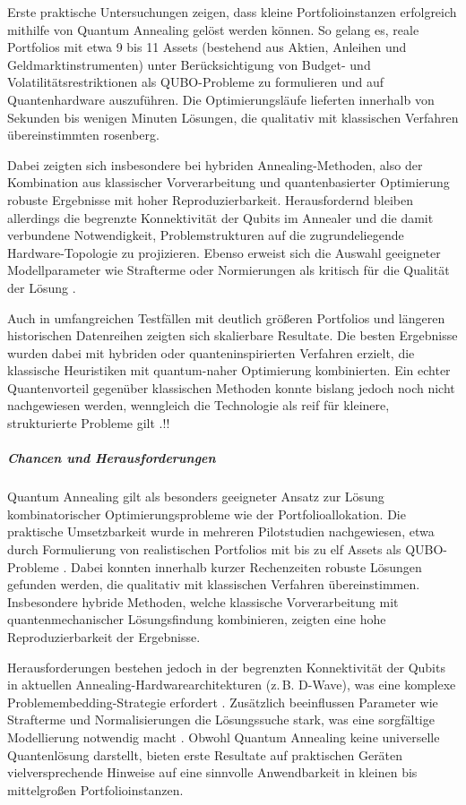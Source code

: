 Erste praktische Untersuchungen zeigen, dass kleine Portfolioinstanzen erfolgreich mithilfe von Quantum Annealing gelöst werden können. So gelang es, reale Portfolios mit etwa 9 bis 11 Assets (bestehend aus Aktien, Anleihen und Geldmarktinstrumenten) unter Berücksichtigung von Budget- und Volatilitätsrestriktionen als QUBO-Probleme zu formulieren und auf Quantenhardware auszuführen. Die Optimierungsläufe lieferten innerhalb von Sekunden bis wenigen Minuten Lösungen, die qualitativ mit klassischen Verfahren übereinstimmten \cite{sakuler_real-world_2025}rosenberg.
 
Dabei zeigten sich insbesondere bei hybriden Annealing-Methoden, also der Kombination aus klassischer Vorverarbeitung und quantenbasierter Optimierung robuste Ergebnisse mit hoher Reproduzierbarkeit. Herausfordernd bleiben allerdings die begrenzte Konnektivität der Qubits im Annealer und die damit verbundene Notwendigkeit, Problemstrukturen auf die zugrundeliegende Hardware-Topologie zu projizieren. Ebenso erweist sich die Auswahl geeigneter Modellparameter wie Strafterme oder Normierungen als kritisch für die Qualität der Lösung \cite{sakuler_real-world_2025}.
 
Auch in umfangreichen Testfällen mit deutlich größeren Portfolios und längeren historischen Datenreihen zeigten sich skalierbare Resultate. Die besten Ergebnisse wurden dabei mit hybriden oder quanteninspirierten Verfahren erzielt, die klassische Heuristiken mit quantum-naher Optimierung kombinierten. Ein echter Quantenvorteil gegenüber klassischen Methoden konnte bislang jedoch noch nicht nachgewiesen werden, wenngleich die Technologie als reif für kleinere, strukturierte Probleme gilt \cite{BBVA, 2020}.!!

\subparagraph{Chancen und Herausforderungen}

Quantum Annealing gilt als besonders geeigneter Ansatz zur Lösung kombinatorischer Optimierungsprobleme wie der Portfolioallokation. Die praktische Umsetzbarkeit wurde in mehreren Pilotstudien nachgewiesen, etwa durch Formulierung von realistischen Portfolios mit bis zu elf Assets als QUBO-Probleme \cite[S. 6]{orus_quantum_2019}. Dabei konnten innerhalb kurzer Rechenzeiten robuste Lösungen gefunden werden, die qualitativ mit klassischen Verfahren übereinstimmen. Insbesondere hybride Methoden, welche klassische Vorverarbeitung mit quantenmechanischer Lösungsfindung kombinieren, zeigten eine hohe Reproduzierbarkeit der Ergebnisse.

Herausforderungen bestehen jedoch in der begrenzten Konnektivität der Qubits in aktuellen Annealing-Hardwarearchitekturen (z.\,B. D-Wave), was eine komplexe Problemembedding-Strategie erfordert \cite[S. 9]{orus_quantum_2019}. Zusätzlich beeinflussen Parameter wie Strafterme und Normalisierungen die Lösungssuche stark, was eine sorgfältige Modellierung notwendig macht \cite[S. 10]{sakuler_real-world_2025}. Obwohl Quantum Annealing keine universelle Quantenlösung darstellt, bieten erste Resultate auf praktischen Geräten vielversprechende Hinweise auf eine sinnvolle Anwendbarkeit in kleinen bis mittelgroßen Portfolioinstanzen.

